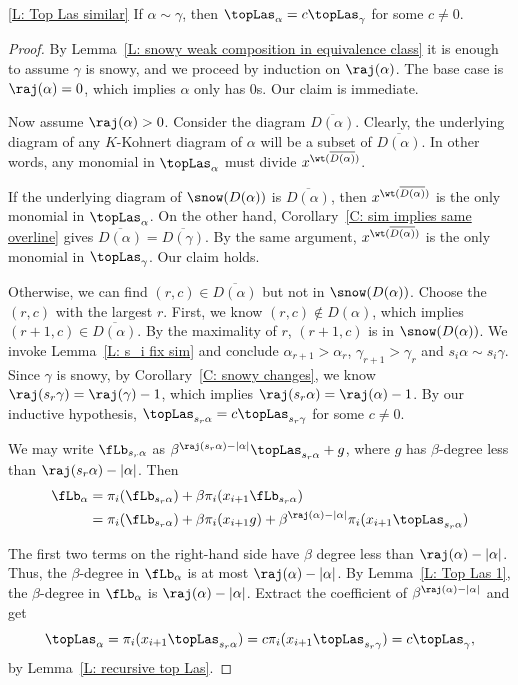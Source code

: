 \begin{manuallemma}{\ref{L: Top Las similar}}
If $\alpha \sim \gamma$, 
then $\topLas_\alpha = c\topLas_\gamma$ for some $c \neq 0$.
\end{manuallemma}
\begin{proof}
By Lemma~\ref{L: snowy weak composition in equivalence class} 
it is enough to assume $\gamma$ is snowy, and we proceed by induction on $\raj(\alpha)$.
The base case is $\raj(\alpha) = 0$,
which implies $\alpha$ only has 0s. 
Our claim is immediate. 

Now assume $\raj(\alpha) > 0$.
Consider the diagram $\overline{D(\alpha)}$.
Clearly, the underlying diagram of any $K$-Kohnert diagram
of $\alpha$ will be a subset of $\overline{D(\alpha)}$.
In other words, any monomial in $\topLas_{\alpha}$
must divide $x^{\wt(\overline{D(\alpha)})}$.

If the underlying diagram of $\snow(D(\alpha))$
is $\overline{D(\alpha)}$, 
then $x^{\wt(\overline{D(\alpha)})}$ is the only monomial
in $\topLas_{\alpha}$.
On the other hand, 
Corollary~\ref{C: sim implies same overline} gives
$\overline{D(\alpha)} = \overline{D(\gamma)}$.
By the same argument, $x^{\wt(\overline{D(\alpha)})}$ is the only monomial
in $\topLas_{\gamma}$.
Our claim holds. 

Otherwise, we can find $(r,c) \in \overline{D(\alpha)}$
but not in $\snow(D(\alpha))$.
Choose the $(r,c)$ with the largest $r$.
First, we know $(r,c) \notin D(\alpha)$,
which implies $(r+1, c) \in \overline{D(\alpha)}$.
By the maximality of $r$,
$(r+1, c)$ is in $\snow(D(\alpha))$.
We invoke Lemma~\ref{L: s_i fix sim}
and conclude $\alpha_{r+1} > \alpha_{r}$,
$\gamma_{r+1} > \gamma_{r}$
and $s_i \alpha \sim s_i \gamma$.
Since $\gamma$ is snowy,
by Corollary~\ref{C: snowy changes},
we know $\raj(s_r \gamma) = \raj(\gamma) - 1$,
which implies $\raj(s_r \alpha) = \raj(\alpha) - 1$.
By our inductive hypothesis, 
$\topLas_{s_r \alpha} = c \topLas_{s_r \gamma}$
for some $c \neq 0$.

We may write 
$\fLb_{s_r \alpha}$ 
as $\beta^{\raj(s_r \alpha) - |\alpha|}\topLas_{s_r \alpha} + g$,
where $g$ has $\beta$-degree less than  
$\raj(s_r \alpha) - |\alpha|$.
Then 
\begin{align*}
\fLb_\alpha 
& = \pi_i(\fLb_{s_r \alpha}) + \beta \pi_i(x_{i+1}\fLb_{s_r \alpha})\\
& = \pi_i(\fLb_{s_r \alpha}) + \beta \pi_i(x_{i+1} g) + \beta^{\raj(\alpha) - |\alpha|} \pi_i(x_{i+1} \topLas_{s_r \alpha})    
\end{align*}

The first two terms on the right-hand side have $\beta$ degree 
less than $\raj(\alpha) - |\alpha|$.
Thus, the $\beta$-degree in $\fLb_\alpha$ is at most $\raj(\alpha) - |\alpha|$.
By Lemma~\ref{L: Top Las 1},
the $\beta$-degree in $\fLb_\alpha$ is $\raj(\alpha) - |\alpha|$.
Extract the coefficient of $\beta^{\raj(\alpha) - |\alpha|}$ and get
$$
\topLas_\alpha = \pi_i(x_{i+1} \topLas_{s_r \alpha}) = c\pi_i(x_{i+1} \topLas_{s_r \gamma}) = c\topLas_{\gamma},
$$
by Lemma~\ref{L: recursive top Las}.
\end{proof}

